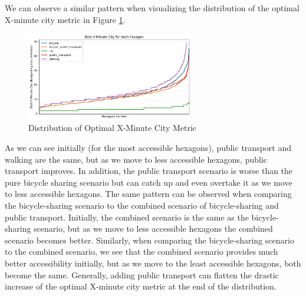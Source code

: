 We can observe a similar pattern when visualizing the distribution of the optimal X-minute city metric in Figure \ref{fig:optimal_x_minute_city_metric}.
\begin{figure}
  \begin{center}
    \includegraphics[width=0.65\textwidth]{Figures/results/minute_city_metric/best_x_minute_city}
  \end{center}
  \caption{Distribution of Optimal X-Minute City Metric}
  \label{fig:optimal_x_minute_city_metric}
\end{figure}
As we can see initially (for the most accessible hexagons), public transport and walking are the same, but as we move to less accessible hexagons, public transport improves.
In addition, the public transport scenario is worse than the pure bicycle sharing scenario but can catch up and even overtake it as we move to less accessible hexagons.
The same pattern can be observed when comparing the bicycle-sharing scenario to the combined scenario of bicycle-sharing and public transport.
Initially, the combined scenario is the same as the bicycle-sharing scenario, but as we move to less accessible hexagons the combined scenario becomes better.
Similarly, when comparing the bicycle-sharing scenario to the combined scenario, we see that the combined scenario provides much better accessibility initially, but as we move to the least accessible hexagons, both become the same.
Generally, adding public transport can flatten the drastic increase of the optimal X-minute city metric at the end of the distribution.


